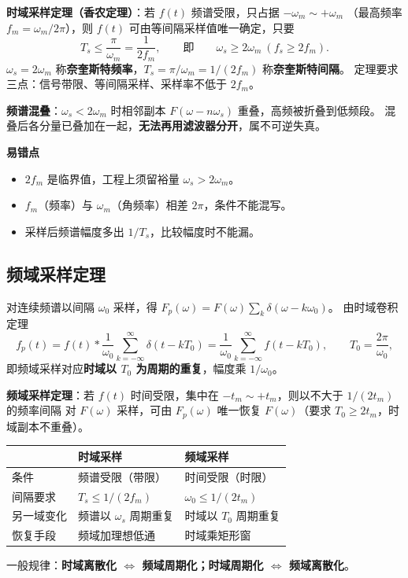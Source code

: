 \textbf{时域采样定理（香农定理）}：若 $f(t)$ 频谱受限，只占据 $-\omega_m\sim+\omega_m$
（最高频率 $f_m=\omega_m/2\pi$），则 $f(t)$ 可由等间隔采样值唯一确定，只要
\begin{equation}
T_s\le\frac{\pi}{\omega_m}=\frac{1}{2f_m},
\qquad\text{即}\qquad \omega_s\ge2\omega_m\ (f_s\ge2f_m).
\end{equation}
$\omega_s=2\omega_m$ 称\textbf{奈奎斯特频率}，$T_s=\pi/\omega_m=1/(2f_m)$ 称\textbf{奈奎斯特间隔}。
定理要求三点：信号带限、等间隔采样、采样率不低于 $2f_m$。

\textbf{频谱混叠}：$\omega_s<2\omega_m$ 时相邻副本 $F(\omega-n\omega_s)$ 重叠，高频被折叠到低频段。
混叠后各分量已叠加在一起，\textbf{无法再用滤波器分开}，属不可逆失真。

\textbf{易错点}
\begin{itemize}
\item $2f_m$ 是临界值，工程上须留裕量 $\omega_s>2\omega_m$。
\item $f_m$（频率）与 $\omega_m$（角频率）相差 $2\pi$，条件不能混写。
\item 采样后频谱幅度多出 $1/T_s$，比较幅度时不能漏。
\end{itemize}

\subsection{频域采样定理}

对连续频谱以间隔 $\omega_0$ 采样，得 $F_p(\omega)=F(\omega)\sum_k\delta(\omega-k\omega_0)$。
由时域卷积定理
\begin{equation}
f_p(t)=f(t)*\frac{1}{\omega_0}\sum_{k=-\infty}^{\infty}\delta(t-kT_0)
=\frac{1}{\omega_0}\sum_{k=-\infty}^{\infty}f(t-kT_0),\qquad T_0=\frac{2\pi}{\omega_0},
\end{equation}
即频域采样对应\textbf{时域以 $T_0$ 为周期的重复}，幅度乘 $1/\omega_0$。

\textbf{频域采样定理}：若 $f(t)$ 时间受限，集中在 $-t_m\sim+t_m$，则以不大于 $1/(2t_m)$ 的频率间隔
对 $F(\omega)$ 采样，可由 $F_p(\omega)$ 唯一恢复 $F(\omega)$（要求 $T_0\ge2t_m$，时域副本不重叠）。

\begin{center}
\begin{tabular}{lll}
\toprule
 & 时域采样 & 频域采样 \\
\midrule
条件 & 频谱受限（带限） & 时间受限（时限） \\
间隔要求 & $T_s\le1/(2f_m)$ & $\omega_0\le1/(2t_m)$ \\
另一域变化 & 频谱以 $\omega_s$ 周期重复 & 时域以 $T_0$ 周期重复 \\
恢复手段 & 频域加理想低通 & 时域乘矩形窗 \\
\bottomrule
\end{tabular}
\end{center}
一般规律：\textbf{时域离散化 $\Leftrightarrow$ 频域周期化；时域周期化 $\Leftrightarrow$ 频域离散化}。

